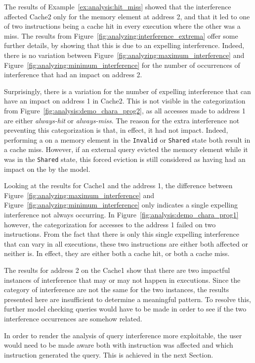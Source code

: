 \begin{example}
The results of Example~\ref{ex:analysis:hit_miss} showed that the interference
affected Cache2 only for the memory element at address 2, and that it led to
one of two instructions being a cache hit in every execution where the other
was a miss. The results from Figure~\ref{fig:analyzing:interference_extrema}
offer some further details, by showing that this is due to an expelling
interference. Indeed, there is no variation between
Figure~\ref{fig:analyzing:maximum_interference} and
Figure~\ref{fig:analyzing:minimum_interference} for the number of occurrences
of interference that had an impact on address 2.

Surprisingly, there is a variation for the number of expelling interference
that can have an impact on address 1 in Cache2. This is not visible in the
categorization from Figure~\ref{fig:analysis:demo_chara_prog2}, as all accesses
made to address 1 are either \textit{always-hit} or \textit{always-miss}. The
reason for the extra interference not preventing this categorization is that,
in effect, it had not impact. Indeed, performing a \storeinstr{} on a memory
element in the \texttt{Invalid} or \texttt{Shared} state both result in a cache
miss. However, if an external query evicted the memory element while it was in
the \texttt{Shared} state, this forced eviction is still considered as having
had an impact on the \storeinstr{} by the model.

Looking at the results for Cache1 and the address 1, the difference between
Figure~\ref{fig:analyzing:maximum_interference} and
Figure~\ref{fig:analyzing:minimum_interference} only indicates a single
expelling interference not always occurring. In
Figure~\ref{fig:analysis:demo_chara_prog1} however, the categorization for
accesses to the address 1 failed on two instructions. From the fact that there
is only this single expelling interference that can vary in all executions,
these two instructions are either both affected or neither is. In effect, they
are either both a cache hit, or both a cache miss.

The results for address 2 on the Cache1 show that there are two impactful
instances of interference that may or may not happen in executions. Since the
category of interference are not the same for the two instances, the results
presented here are insufficient to determine a meaningful pattern. To resolve
this, further model checking queries would have to be made in order to see if
the two interference occurrences are somehow related.
\end{example}

In order to render the analysis of query interference more exploitable, the
user would need to be made aware both with instruction was affected and which
instruction generated the query. This is achieved in the next Section.
